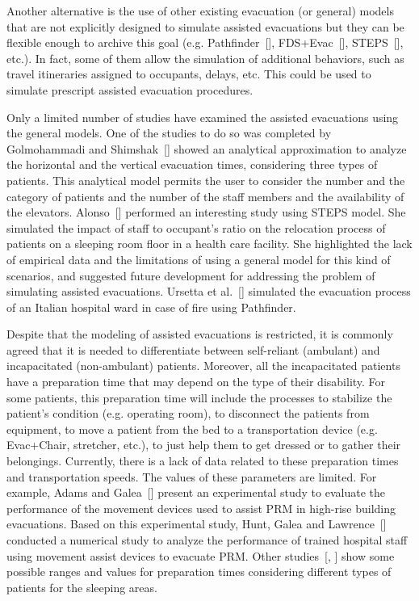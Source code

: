 \documentclass{style/llncs}
\begin{document}
Another alternative is the use of other existing evacuation (or general)
models that are not explicitly designed to simulate assisted evacuations
but they can be flexible enough to archive this goal (e.g.
Pathfinder~[], FDS+Evac~[], STEPS~[], etc.). In fact, some of them
allow the simulation of additional behaviors, such as travel itineraries
assigned to occupants, delays, etc. This could be used to simulate
prescript assisted evacuation procedures.%

Only a limited number of studies have examined the assisted evacuations
using the general models. One of the studies to do so was completed by
Golmohammadi and Shimshak~[] showed an analytical approximation to
analyze the horizontal and the vertical evacuation times, considering
three types of patients. This analytical model permits the user to
consider the number and the category of patients and the number of the
staff members and the availability of the elevators. Alonso~[]
performed an interesting study using STEPS model. She simulated the
impact of staff to occupant's ratio on the relocation process of patients
on a sleeping room floor in a health care facility. She highlighted the
lack of empirical data and the limitations of using a general model for
this kind of scenarios, and suggested future development for addressing
the problem of simulating assisted evacuations. Ursetta et al.~[]
simulated the evacuation process of an Italian hospital ward in case of
fire using Pathfinder.%

Despite that the modeling of assisted evacuations is restricted, it is
commonly agreed that it is needed to differentiate between self-reliant
(ambulant) and incapacitated (non-ambulant) patients. Moreover, all the
incapacitated patients have a preparation time that may depend on the
type of their disability. For some patients, this preparation time will
include the processes to stabilize the patient's condition (e.g.
operating room), to disconnect the patients from equipment, to move a
patient from the bed to a transportation device (e.g. Evac+Chair,
stretcher, etc.), to just help them to get dressed or to gather their
belongings. Currently, there is a lack of data related to these
preparation times and transportation speeds. The values of these
parameters are limited. For example, Adams and Galea~[] present an
experimental study to evaluate the performance of the movement devices
used to assist PRM in high-rise building evacuations. Based on this
experimental study, Hunt, Galea and Lawrence~[] conducted a numerical
study to analyze the performance of trained hospital staff using movement
assist devices to evacuate PRM. Other studies~[, ] show some possible
ranges and values for preparation times considering different types of
patients for the sleeping areas.%
\end{document}
